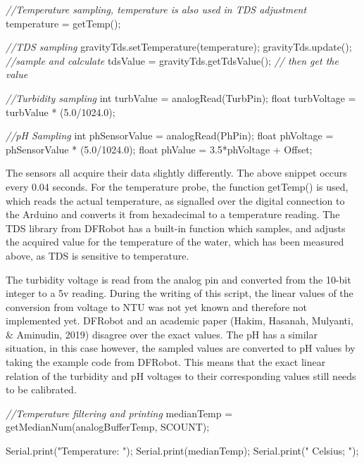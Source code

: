 \documentclass[
  english,
  man,floatsintext]{apa6}
\newenvironment{Shaded}{\begin{snugshade}}{\end{snugshade}}
\newcommand{\CommentTok}[1]{\textcolor[rgb]{0.56,0.35,0.01}{\textit{#1}}}
\newcommand{\DataTypeTok}[1]{\textcolor[rgb]{0.13,0.29,0.53}{#1}}
\newcommand{\FloatTok}[1]{\textcolor[rgb]{0.00,0.00,0.81}{#1}}
\newcommand{\NormalTok}[1]{#1}
\newcommand{\StringTok}[1]{\textcolor[rgb]{0.31,0.60,0.02}{#1}}
\begin{document}
\begin{Shaded}
\begin{Highlighting}[]

\CommentTok{//Temperature sampling, temperature is also used in TDS adjustment}
\NormalTok{temperature = getTemp();  }

\CommentTok{//TDS sampling}
\NormalTok{gravityTds.setTemperature(temperature);  }
\NormalTok{gravityTds.update();  }\CommentTok{//sample and calculate}
\NormalTok{tdsValue = gravityTds.getTdsValue();  }\CommentTok{// then get the value}

\CommentTok{//Turbidity sampling}
\DataTypeTok{int}\NormalTok{ turbValue = analogRead(TurbPin);}
\DataTypeTok{float}\NormalTok{ turbVoltage = turbValue * (}\FloatTok{5.0}\NormalTok{/}\FloatTok{1024.0}\NormalTok{);     }

\CommentTok{//pH Sampling}
\DataTypeTok{int}\NormalTok{ phSensorValue = analogRead(PhPin);}
\DataTypeTok{float}\NormalTok{ phVoltage = phSensorValue * (}\FloatTok{5.0}\NormalTok{/}\FloatTok{1024.0}\NormalTok{);}
\DataTypeTok{float}\NormalTok{ phValue = }\FloatTok{3.5}\NormalTok{*phVoltage + Offset;}
\end{Highlighting}
\end{Shaded}



The sensors all acquire their data slightly differently. The above snippet occurs every 0.04 seconds. For the temperature probe, the function getTemp() is used, which reads the actual temperature, as signalled over the digital connection to the Arduino and converts it from hexadecimal to a temperature reading. The TDS library from DFRobot has a built-in function which samples, and adjusts the acquired value for the temperature of the water, which has been measured above, as TDS is sensitive to temperature.

The turbidity voltage is read from the analog pin and converted from the 10-bit integer to a 5v reading. During the writing of this script, the linear values of the conversion from voltage to NTU was not yet known and therefore not implemented yet. DFRobot and an academic paper (Hakim, Hasanah, Mulyanti, \& Aminudin, 2019) disagree over the exact values. The pH has a similar situation, in this case however, the sampled values are converted to pH values by taking the example code from DFRobot. This means that the exact linear relation of the turbidity and pH voltages to their corresponding values still needs to be calibrated.

\begin{Shaded}
\begin{Highlighting}[]

\CommentTok{//Temperature filtering and printing}
\NormalTok{medianTemp = getMedianNum(analogBufferTemp, SCOUNT);}

\NormalTok{Serial.print(}\StringTok{"Temperature: "}\NormalTok{);}
\NormalTok{Serial.print(medianTemp);}
\NormalTok{Serial.print(}\StringTok{" Celsius; "}\NormalTok{);}
\end{Highlighting}
\end{Shaded}
\end{document}
